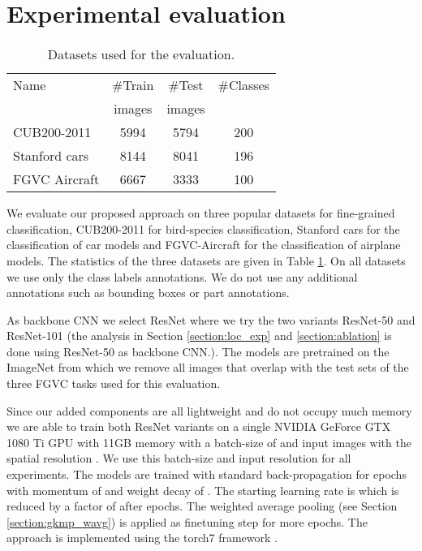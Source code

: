 \documentclass[10pt,twocolumn,letterpaper]{article}
\begin{document}
\section{Experimental evaluation}
\label{section:eval}
\begin{table}
  \begin{center}
  \begin{tabular} {|l|c|c|c|}
    \hline
    Name & \#Train & \#Test & \#Classes\\
         & images  & images & \\
    \hline
    \hline
    CUB200-2011 \cite{birds} & 5994 & 5794 & 200 \\
    \hline
    Stanford cars \cite{cars} & 8144 & 8041 & 196\\
    \hline
    FGVC Aircraft \cite{aircraft} & 6667 & 3333 & 100\\
    \hline
  \end{tabular}
  \end{center}
  \caption{Datasets used for the evaluation.}
  \label{table:data}
\end{table}
We evaluate our proposed approach on three popular datasets for fine-grained classification, CUB200-2011 \cite{birds}  for bird-species classification, Stanford cars \cite{cars} for the classification of car models and FGVC-Aircraft \cite{aircraft} for the classification of airplane models. The statistics of the three datasets are given in Table \ref{table:data}. On all datasets we use only the class labels annotations. We do not use any additional annotations such as bounding boxes or part annotations.

As backbone CNN we select ResNet \cite{he2016deep} where we try the two variants ResNet-50 and ResNet-101 (the analysis in Section \ref{section:loc_exp} and \ref{section:ablation} is done using ResNet-50 as backbone CNN.). The models are pretrained on the ImageNet \cite{deng2009imagenet} from which we remove all images that overlap with the test sets of the three FGVC tasks used for this evaluation.

Since our added components are all lightweight and do not occupy much memory we are able to train both ResNet variants on a single NVIDIA GeForce GTX 1080 Ti GPU with 11GB memory with a batch-size of  and input images with the spatial resolution . We use this batch-size and input resolution for all experiments. The models are trained with standard back-propagation for  epochs with momentum of  and weight decay of . The starting learning rate is  which is reduced by a factor of  after  epochs. The weighted average pooling (see Section \ref{section:gkmp_wavg}) is applied as finetuning step for  more epochs. The approach is implemented using the torch7 framework \cite{collobert2011torch7}.
\end{document}

